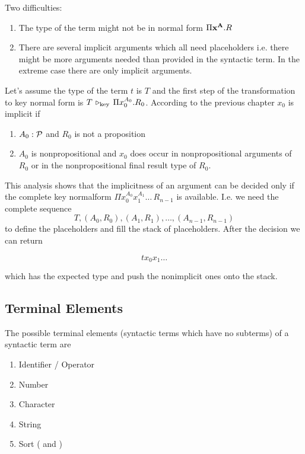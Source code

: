 Two difficulties:

\begin{enumerate}

\item The type of the term might not be in normal form $\Pi \mathbf{x}^{\mathbf{A}} . R$

\item There are several implicit arguments which all need placeholders
  i.e. there might be more arguments needed than provided in the syntactic
  term. In the extreme case there are only implicit arguments.

\end{enumerate}

Let's assume the type of the term $t$ is $T$ and the first step of the
transformation to key normal form is $T \,\triangleright_\text{key}\, \Pi
x_0^{A_0}. R_0$. According to the previous chapter $x_0$ is implicit if
\begin{enumerate}

\item $A_0:{\cal{P}}$ and $R_0$ is not a proposition

\item $A_0$ is nonpropositional and $x_0$ does occur in nonpropositional
  arguments of $R_0$ or in the nonpropositional final result type of $R_0$.
\end{enumerate}

This analysis shows that the implicitness of an argument can be decided only
if the complete key normalform $\Pi x_0^{A_0} x_1^{A_1} \ldots\, R_{n-1}$ is
available. I.e. we need the complete sequence
$$
   T, (A_0, R_0), (A_1, R_1), \ldots, (A_{n-1}, R_{n-1})
$$
to define the placeholders and fill the stack of placeholders. After the
decision we can return

$$
   t x_0 x_1 \ldots
$$

which has the expected type and push the nonimplicit ones onto the stack.






\subsection{Terminal Elements}

The possible terminal elements (syntactic terms which have no subterms) of a
syntactic term are
%
\begin{enumerate}

\item Identifier / Operator

\item Number

\item Character

\item String

\item Sort ( and )
\end{enumerate}

